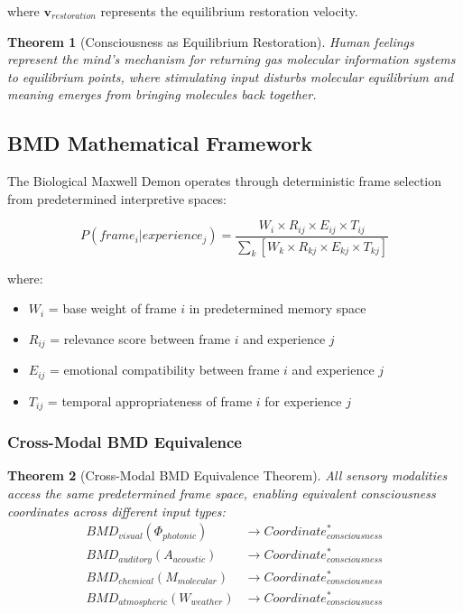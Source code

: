 \documentclass[12pt,a4paper]{article}
\newtheorem{theorem}{Theorem}
\begin{document}
where $\mathbf{v}_{restoration}$ represents the equilibrium restoration velocity.

\begin{theorem}[Consciousness as Equilibrium Restoration]
Human feelings represent the mind's mechanism for returning gas molecular information systems to equilibrium points, where stimulating input disturbs molecular equilibrium and meaning emerges from bringing molecules back together.
\end{theorem}

\subsection{BMD Mathematical Framework}

The Biological Maxwell Demon operates through deterministic frame selection from predetermined interpretive spaces:

\begin{equation}
P(frame_i | experience_j) = \frac{W_i \times R_{ij} \times E_{ij} \times T_{ij}}{\sum_k[W_k \times R_{kj} \times E_{kj} \times T_{kj}]}
\end{equation}

where:
\begin{itemize}
\item $W_i$ = base weight of frame $i$ in predetermined memory space
\item $R_{ij}$ = relevance score between frame $i$ and experience $j$
\item $E_{ij}$ = emotional compatibility between frame $i$ and experience $j$
\item $T_{ij}$ = temporal appropriateness of frame $i$ for experience $j$
\end{itemize}

\subsubsection{Cross-Modal BMD Equivalence}

\begin{theorem}[Cross-Modal BMD Equivalence Theorem]
All sensory modalities access the same predetermined frame space, enabling equivalent consciousness coordinates across different input types:
\begin{align}
BMD_{visual}(\Phi_{photonic}) &\rightarrow Coordinate_{consciousness}^* \\
BMD_{auditory}(A_{acoustic}) &\rightarrow Coordinate_{consciousness}^* \\
BMD_{chemical}(M_{molecular}) &\rightarrow Coordinate_{consciousness}^* \\
BMD_{atmospheric}(W_{weather}) &\rightarrow Coordinate_{consciousness}^*
\end{align}
\end{theorem}
\end{document}
